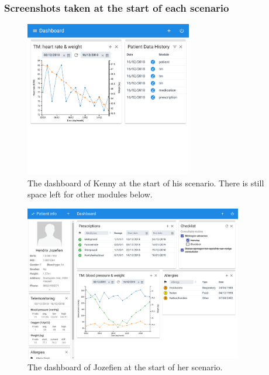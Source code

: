     \newpage
    \subsubsection{Screenshots taken at the start of each scenario}\label{appendix_test_screens}

    \begin{figure}[h!]
        \centering
        \includegraphics[width=0.65\textwidth]{chapters/appendix/test_kenny}
        \caption{The dashboard of Kenny at the start of his scenario. There is still space left for other modules below.}
    \end{figure}
    \begin{figure}[h!]
        \centering
        \includegraphics[width=0.85\textwidth]{chapters/appendix/test_jozefien}
        \caption{The dashboard of Jozefien at the start of her scenario.}
    \end{figure}
